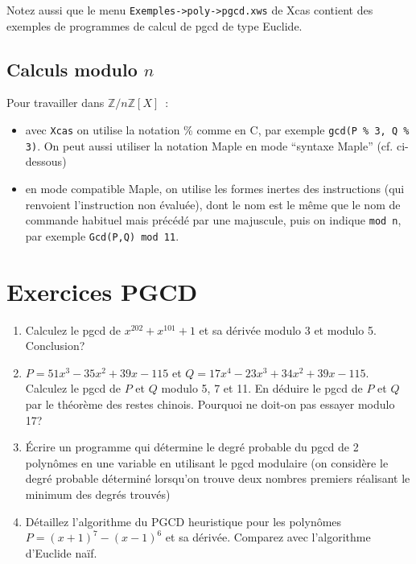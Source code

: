 \documentclass[a4paper,11pt]{book}
\begin{document}
\begin{giacjshere}
Notez aussi que le menu \verb|Exemples->poly->pgcd.xws| de Xcas contient 
des exemples de programmes de calcul de pgcd de type Euclide.

\subsection{Calculs modulo $n$}
Pour travailler dans $\mathbb{Z}/n\mathbb{Z}[X]$~:
\begin{itemize}
\item avec \verb|Xcas| on utilise la notation \% comme en C, par
exemple {\tt gcd(P \% 3, Q \% 3)}. On peut aussi utiliser la notation
Maple en mode ``syntaxe Maple'' (cf. ci-dessous)
\item en mode compatible Maple,
on utilise les formes inertes des instructions (qui renvoient l'instruction
non \'evalu\'ee), dont le nom est le m\^eme que le nom de commande
habituel mais pr\'ec\'ed\'e par une majuscule, puis on indique
\verb|mod n|, par exemple \verb|Gcd(P,Q) mod 11|.
\end{itemize}

\pagebreak

\section{Exercices PGCD}
\begin{enumerate}

\item Calculez le pgcd de $x^{202}+x^{101}+1$
et sa dérivée modulo 3 et modulo 5. Conclusion?

\item $P=51x^3-35x^2+39x-115$ et $Q=17x^4-23x^3+34x^2+39x-115$.
Calculez le pgcd de $P$ et $Q$ modulo 5, 7 et 11. En déduire
le pgcd de $P$ et $Q$ par le théorème des restes chinois. Pourquoi
ne doit-on pas essayer modulo 17?

\item \'Ecrire un programme qui d\'etermine le degr\'e probable
du pgcd de 2 polyn\^omes en une variable en utilisant le pgcd modulaire 
(on consid\`ere le degr\'e probable d\'etermin\'e lorsqu'on trouve
deux nombres premiers r\'ealisant le minimum des degr\'es trouv\'es)

\item Détaillez l'algorithme du PGCD heuristique pour les
polynômes  $P=(x+1)^7-(x-1)^6$ et sa dérivée. Comparez avec l'algorithme
d'Euclide naïf.


\end{enumerate}
\end{giacjshere}
\end{document}
